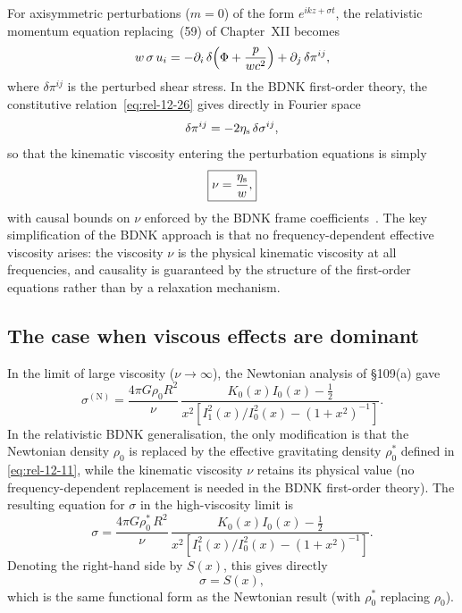 For axisymmetric perturbations ($m=0$) of the form $e^{ikz+\sigma t}$,
the relativistic momentum equation replacing~(59) of Chapter~XII becomes
\begin{equation}
\label{eq:rel-12-28}
w\,\sigma\,u_{i}
  = -\partial_{i}\,\delta\!\left(\Phi + \frac{p}{w c^{2}}\right)
  + \partial_{j}\,\delta\pi^{ij},
\end{equation}
where $\delta\pi^{ij}$ is the perturbed shear stress.  In the BDNK
first-order theory, the constitutive relation~\eqref{eq:rel-12-26}
gives directly in Fourier space
\begin{equation}
\label{eq:rel-12-29}
\delta\pi^{ij} = -2\eta_{\mathrm{s}}\,\delta\sigma^{ij},
\end{equation}
so that the kinematic viscosity entering the perturbation equations is
simply
\begin{equation}
\label{eq:rel-12-30}
\boxed{\nu = \frac{\eta_{\mathrm{s}}}{w},}
\end{equation}
with causal bounds on $\nu$ enforced by the BDNK frame
coefficients~\cite{BemficaDNK2023,HoultKovtun2020}.  The key simplification of
the BDNK approach is that no frequency-dependent effective viscosity
arises: the viscosity $\nu$ is the physical kinematic viscosity at all
frequencies, and causality is guaranteed by the structure of the
first-order equations rather than by a relaxation mechanism.

\subsection{The case when viscous effects are dominant}
\label{sec:rel-12-109c}

In the limit of large viscosity ($\nu\to\infty$),
the Newtonian analysis of \S109(a) gave
\begin{equation}
\label{eq:rel-12-31}
\sigma^{(\mathrm{N})} = \frac{4\pi G\rho_{0}R^{2}}{\nu}\,
  \frac{K_{0}(x)I_{0}(x)-\frac{1}{2}}{x^{2}
  [I_{1}^{2}(x)/I_{0}^{2}(x)-(1+x^{2})^{-1}]}.
\end{equation}
In the relativistic BDNK generalisation, the only modification is that
the Newtonian density $\rho_{0}$ is replaced by the effective
gravitating density $\rho_{0}^{*}$ defined in \eqref{eq:rel-12-11},
while the kinematic viscosity $\nu$ retains its physical value (no
frequency-dependent replacement is needed in the BDNK first-order theory).
The resulting equation for $\sigma$ in the high-viscosity limit is
\begin{equation}
\label{eq:rel-12-32}
\sigma = \frac{4\pi G\rho_{0}^{*}\,R^{2}}{\nu}\,
  \frac{K_{0}(x)I_{0}(x)-\frac{1}{2}}{x^{2}
  [I_{1}^{2}(x)/I_{0}^{2}(x)-(1+x^{2})^{-1}]}.
\end{equation}
Denoting the right-hand side by $S(x)$, this gives directly
\begin{equation}
\label{eq:rel-12-34}
\sigma = S(x),
\end{equation}
which is the same functional form as the Newtonian result (with
$\rho_{0}^{*}$ replacing $\rho_{0}$).

